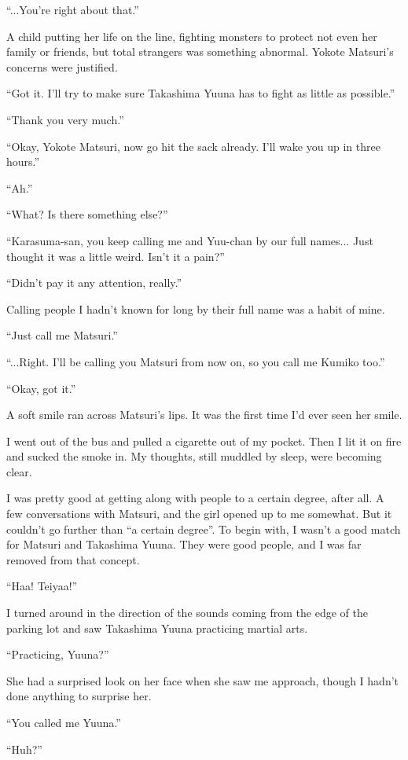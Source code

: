 ``...You're right about that.''

A child putting her life on the line, fighting monsters to protect not even her family or friends, but total strangers was something abnormal. Yokote Matsuri's concerns were justified.

``Got it. I'll try to make sure Takashima Yuuna has to fight as little as possible.''

``Thank you very much.''

``Okay, Yokote Matsuri, now go hit the sack already. I'll wake you up in three hours.''

``Ah.''

``What? Is there something else?''

``Karasuma-san, you keep calling me and Yuu-chan by our full names... Just thought it was a little weird. Isn't it a pain?''

``Didn't pay it any attention, really.''

Calling people I hadn't known for long by their full name was a habit of mine.

``Just call me Matsuri.''

``...Right. I'll be calling you Matsuri from now on, so you call me Kumiko too.''

``Okay, got it.''

A soft smile ran across Matsuri's lips. It was the first time I'd ever seen her smile.

I went out of the bus and pulled a cigarette out of my pocket. Then I lit it on fire and sucked the smoke in. My thoughts, still muddled by sleep, were becoming clear.

I was pretty good at getting along with people to a certain degree, after all. A few conversations with Matsuri, and the girl opened up to me somewhat. But it couldn't go further than ``a certain degree''. To begin with, I wasn't a good match for Matsuri and Takashima Yuuna. They were good people, and I was far removed from that concept.

``Haa! Teiyaa!''

I turned around in the direction of the sounds coming from the edge of the parking lot and saw Takashima Yuuna practicing martial arts.

``Practicing, Yuuna?''

She had a surprised look on her face when she saw me approach, though I hadn't done anything to surprise her.

``You called me Yuuna.''

``Huh?''

